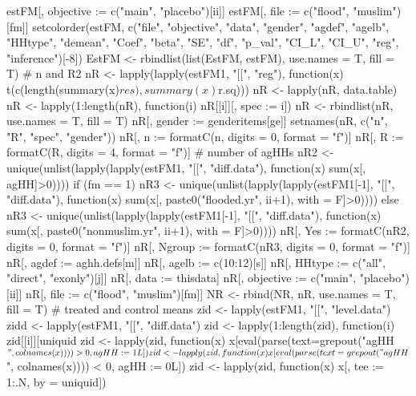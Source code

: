 \begin{Schunk}
\begin{Sinput}
{{{{{{{{                estFM[, objective := c("main", "placebo")[ii]]
                estFM[, file := c("flood", "muslim")[fm]]
                setcolorder(estFM,  c("file", "objective", "data", "gender", "agdef", "agelb", "HHtype", 
                  "demean", "Coef", "beta", "SE", "df", "p_val", "CI_L", "CI_U", "reg", "inference")[-8])
                EstFM <- rbindlist(list(EstFM, estFM), use.names = T, fill = T)
                # n and R2
                nR <- lapply(lapply(estFM1, "[[", "reg"), 
                  function(x) t(c(length(summary(x)$res), summary(x)$r.sq)))
                nR <- lapply(nR, data.table)
                nR <- lapply(1:length(nR), function(i) nR[[i]][, spec := i])
                nR <- rbindlist(nR, use.names = T, fill = T)
                nR[, gender := genderitems[ge]]
                setnames(nR, c("n", "R", "spec", "gender"))
                nR[, n := formatC(n, digits = 0, format = "f")]
                nR[, R := formatC(R, digits = 4, format = "f")]
                # number of agHHs
                nR2 <- unique(unlist(lapply(lapply(estFM1, "[[", "diff.data"), 
                  function(x) sum(x[, agHH]>0))))
                if (fm == 1) 
                  nR3 <- unique(unlist(lapply(lapply(estFM1[-1], "[[", "diff.data"), 
                    function(x) sum(x[, paste0("flooded.yr", ii+1), with = F]>0)))) else
                  nR3 <- unique(unlist(lapply(lapply(estFM1[-1], "[[", "diff.data"), 
                    function(x) sum(x[, paste0("nonmuslim.yr", ii+1), with = F]>0))))
                nR[, Yes := formatC(nR2, digits = 0, format = "f")]
                nR[, Ngroup := formatC(nR3, digits = 0, format = "f")]
                nR[, agdef := aghh.defs[m]]
                nR[, agelb := c(10:12)[s]]
                nR[, HHtype := c("all", "direct", "exonly")[j]]
                nR[, data := thisdata]
                nR[, objective := c("main", "placebo")[ii]]
                nR[, file := c("flood", "muslim")[fm]]
                NR <- rbind(NR, nR, use.names = T, fill = T)
                # treated and control means
                zid <- lapply(estFM1, "[[", "level.data")
                zidd <- lapply(estFM1, "[[", "diff.data")
                zid <- lapply(1:length(zid), function(i) zid[[i]][uniquid %in% zidd[[i]][, uniquid], ])
                zid <- lapply(zid, function(x) x[eval(parse(text=grepout("agHH$", colnames(x)))) > 0, 
                          agHH := 1L])
                zid <- lapply(zid, function(x) x[eval(parse(text=grepout("agHH$", colnames(x)))) < 0, 
                          agHH := 0L])
                zid <- lapply(zid, function(x) x[, tee := 1:.N, by = uniquid])
}}}}}}}}
\end{Sinput}
\end{Schunk}
